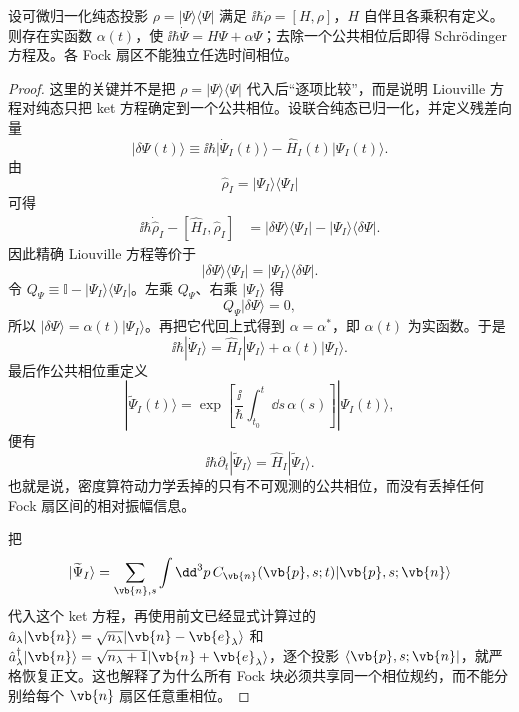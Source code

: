 \begin{lemma}
设可微归一化纯态投影 $\rho=|\Psi\rangle\langle\Psi|$ 满足 $\ii\hbar\dot\rho=[H,\rho]$，$H$ 自伴且各乘积有定义。则存在实函数 $\alpha(t)$，使 $\ii\hbar\dot\Psi=H\Psi+\alpha\Psi$；去除一个公共相位后即得 Schr\"odinger 方程及。各 Fock 扇区不能独立任选时间相位。
\end{lemma}
\begin{proof}
这里的关键并不是把 $\rho=|\Psi\rangle\langle\Psi|$ 代入后“逐项比较”，而是说明 Liouville 方程对纯态只把 ket 方程确定到一个公共相位。设联合纯态已归一化，并定义残差向量
\[
|\delta\Psi(t)\rangle
\equiv
\ii\hbar|\dot\Psi_I(t)\rangle
-\hat H_I(t)|\Psi_I(t)\rangle.
\]
由
\[
\hat\rho_I=|\Psi_I\rangle\langle\Psi_I|
\]
可得
\begin{align*}
\ii\hbar\dot{\hat\rho}_I-[\hat H_I,\hat\rho_I]
&=|\delta\Psi\rangle\langle\Psi_I|
-|\Psi_I\rangle\langle\delta\Psi|.
\end{align*}
因此精确 Liouville 方程等价于
\[
|\delta\Psi\rangle\langle\Psi_I|
=|\Psi_I\rangle\langle\delta\Psi|.
\]
令 $Q_\Psi\equiv\mathbb I-|\Psi_I\rangle\langle\Psi_I|$。左乘 $Q_\Psi$、右乘 $|\Psi_I\rangle$ 得
\[
Q_\Psi|\delta\Psi\rangle=0,
\]
所以 $|\delta\Psi\rangle=\alpha(t)|\Psi_I\rangle$。再把它代回上式得到 $\alpha=\alpha^*$，即 $\alpha(t)$ 为实函数。于是
\[
\ii\hbar|\dot\Psi_I\rangle
=\hat H_I|\Psi_I\rangle+\alpha(t)|\Psi_I\rangle.
\]
最后作公共相位重定义
\[
|\widetilde\Psi_I(t)\rangle
=\exp\!\left[
\frac{\ii}{\hbar}\int_{t_0}^{t}\dd s\,\alpha(s)
\right]
|\Psi_I(t)\rangle,
\]
便有
\[
\ii\hbar\partial_t|\widetilde\Psi_I\rangle
=\hat H_I|\widetilde\Psi_I\rangle.
\]
也就是说，密度算符动力学丢掉的只有不可观测的公共相位，而没有丢掉任何 Fock 扇区间的相对振幅信息。

把
\[
|\widetilde\Psi_I\rangle
=\sum_{\vb{n},s}\int\dd^3p\,
C_{\vb{n}}(\vb{p},s;t)
|\vb{p},s;\vb{n}\rangle
\]
代入这个 ket 方程，再使用前文已经显式计算过的
$\hat a_\lambda|\vb{n}\rangle=\sqrt{n_\lambda}|\vb{n}-\vb{e}_\lambda\rangle$
和
$\hat a_\lambda^\dagger|\vb{n}\rangle=\sqrt{n_\lambda+1}|\vb{n}+\vb{e}_\lambda\rangle$，逐个投影 $\langle\vb{p},s;\vb{n}|$，就严格恢复正文。这也解释了为什么所有 Fock 块必须共享同一个相位规约，而不能分别给每个 $\vb{n}$ 扇区任意重相位。
\end{proof}


